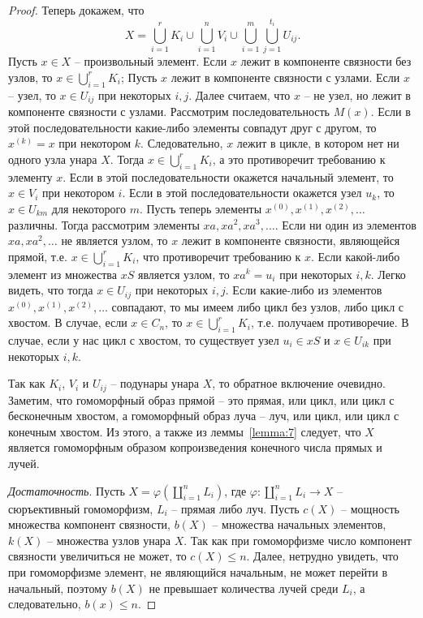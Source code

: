 \documentclass[11pt,twoside,final
]{article}
\begin{document}
\begin{proof}
	Теперь докажем, что
	\[
		X = \bigcup_{i = 1}^r K_i \cup \bigcup_{i = 1}^n V_i \cup \bigcup_{i = 1}^m \bigcup_{j = 1}^{t_i} U_{ij}.
	\]
	Пусть $x \in X$ -- произвольный элемент.
	Если $x$ лежит в компоненте связности без узлов, то $x \in \bigcup_{i = 1}^r K_i$;
	Пусть $x$ лежит в компоненте связности с узлами.
	Если $x$ -- узел, то $x \in U_{ij}$ при некоторых $i,j$.
	Далее считаем, что $x$ -- не узел, но лежит в компоненте связности с узлами.
	Рассмотрим последовательность $M(x)$.
	Если в этой последовательности какие-либо элементы совпадут друг с другом, то $x^{(k)} = x$ при некотором $k$.
	Следовательно, $x$ лежит в цикле, в котором нет ни одного узла унара $X$.
	Тогда $x \in \bigcup_{i = 1}^r K_i$, а это противоречит требованию к элементу $x$.
	Если в этой последовательности окажется начальный элемент, то $x \in V_i$ при некотором $i$.
	Если в этой последовательности окажется узел $u_k$, то $x \in U_{km}$ для некоторого $m$.
	Пусть теперь элементы $x^{(0)}, x^{(1)}, x^{(2)}, \ldots$ различны.
	Тогда рассмотрим элементы $xa, xa^2, xa^3, \ldots$.
	Если ни один из элементов $xa, xa^2, \ldots$ не является узлом, то $x$ лежит в компоненте связности, являющейся прямой, т.е. $x \in \bigcup_{i = 1}^r K_i$, что противоречит требованию к $x$.
	Если какой-либо элемент из множества $xS$ является узлом, то $x a^k = u_i$ при некоторых $i,k$.
	Легко видеть, что тогда $x \in U_{ij}$ при некоторых $i,j$.
	Если какие-либо из элементов $x^{(0)}, x^{(1)}, x^{(2)}, \ldots$ совпадают, то мы имеем либо цикл без узлов, либо цикл с хвостом.
	В случае, если $x \in C_n$, то $x \in \bigcup_{i = 1}^r K_i$, т.е. получаем противоречие.
	В случае, если у нас цикл с хвостом, то существует узел $u_i \in xS$ и $x \in U_{ik}$ при некоторых $i,k$.

	Так как $K_i$, $V_i$ и $U_{ij}$ -- подунары унара $X$, то обратное включение очевидно.
	Заметим, что гомоморфный образ прямой -- это прямая, или цикл, или цикл с бесконечным хвостом, а гомоморфный образ луча -- луч, или цикл, или цикл с конечным хвостом.
	Из этого, а также из леммы~\ref{lemma:7} следует, что $X$ является гомоморфным образом копроизведения конечного числа прямых и лучей.

	\textit{Достаточность}.
	Пусть $X = \varphi(\coprod_{i = 1}^{n} L_i)$, где $\varphi: \coprod_{i = 1}^{n} L_i \rightarrow X$ -- сюръективный гомоморфизм, $L_i$ -- прямая либо луч.
	Пусть $c(X)$ -- мощность множества компонент связности, $b(X)$ -- множества начальных элементов, $k(X)$ -- множества узлов унара $X$.
	Так как при гомоморфизме число компонент связности увеличиться не может, то $c(X) \leqslant n$.
	Далее, нетрудно увидеть, что при гомоморфизме элемент, не являющийся начальным, не может перейти в начальный, поэтому $b(X)$ не превышает количества лучей среди $L_i$, а следовательно, $b(x) \leqslant n$.


\end{proof}
\end{document}
